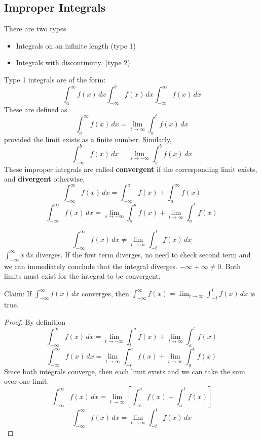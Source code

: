\documentclass[english, 12pt]{article}
\begin{document}
\subsection{Improper Integrals}
There are two types
\begin{itemize}
\item Integrals on an infinite length (type 1)
\item Integrals with discontinuity. (type 2)
\end{itemize}
Type 1 integrals are of the form:
\[ \int_a^\infty f(x)\,dx \int_{-\infty}^b f(x)\,dx \int_{-\infty}^\infty f(x)\,dx \]
These are defined as
\[ \int_a^\infty f(x)\,dx = \lim_{t \to \infty} \int_a^t f(x)\,dx  \]
provided the limit exists as a finite number. Similarly,
\[ \int_{-\infty}^b f(x)\,dx = \lim_{s \to -\infty} \int_s^b f(x)\,dx  \]
These improper integrals are called \textbf{convergent} if the corresponding limit exists, and \textbf{divergent} otherwise.\\
\[ \int_{-\infty}^\infty f(x)\,dx = \int_{-\infty}^a f(x) + \int_a^\infty f(x)\]
\[ \int_{-\infty}^\infty f(x)\,dx = \lim_{s \to -\infty} \int_s^a f(x) + \lim_{t \to \infty}  \int_a^t f(x)\]
\begin{note}
\[ \int_{-\infty}^\infty f(x)\,dx \neq \lim_{t \to \infty} \int_{-t}^{t} f(x)\,dx \]
$ \int_{- \infty}^\infty x\,dx$ diverges. If the first term diverges, no need to check second term and we can immediately conclude that the integral diverges. $-\infty + \infty \neq 0 $. Both limits must exist for the integral to be convergent.
\end{note}
\begin{thrm}
Claim: If $\int_{- \infty}^\infty f(x)\, dx$ converges, then $\int_{- \infty}^\infty f(x) = \lim_{t \to \infty} \int_{-t}^t f(x)\,dx$ is true.
\begin{proof}
By definition 
\[ \int_{-\infty}^\infty f(x)\,dx = \lim_{t \to - \infty} \int_t^a f(x) + \lim_{t \to \infty}  \int_a^t f(x)\]
\[ \int_{-\infty}^\infty f(x)\,dx = \lim_{t \to \infty} \int_{-t}^a f(x) + \lim_{t \to \infty}  \int_a^t f(x)\]
Since both integrals converge, then each limit exists and we can take the sum over one limit.
\[ \int_{-\infty}^\infty f(x)\,dx = \lim_{t \to \infty} [\int_{-t}^a f(x) +  \int_a^t f(x)] \]
\[ \int_{-\infty}^\infty f(x)\,dx = \lim_{t \to \infty} \int_{-t}^t f(x)\,dx \]
\end{proof}
\end{thrm}
\end{document}
